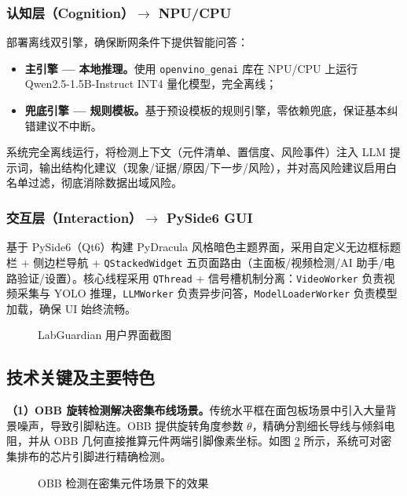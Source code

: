 \documentclass[a4paper,12pt,fontset=ubuntu]{ctexart}
\begin{document}
\subsubsection{认知层（Cognition）$\rightarrow$ NPU/CPU}

部署离线双引擎，确保断网条件下提供智能问答：

\begin{itemize}
    \item \textbf{主引擎 — 本地推理。}使用 \texttt{openvino\_genai} 库在 NPU/CPU 上运行 Qwen2.5-1.5B-Instruct INT4 量化模型，完全离线；
    \item \textbf{兜底引擎 — 规则模板。}基于预设模板的规则引擎，零依赖兜底，保证基本纠错建议不中断。
\end{itemize}

系统完全离线运行，将检测上下文（元件清单、置信度、风险事件）注入 LLM 提示词，输出结构化建议（现象/证据/原因/下一步/风险），并对高风险建议启用白名单过滤，彻底消除数据出域风险。

\subsubsection{交互层（Interaction）$\rightarrow$ PySide6 GUI}

基于 PySide6（Qt6）构建 PyDracula 风格暗色主题界面，采用自定义无边框标题栏 + 侧边栏导航 + \texttt{QStackedWidget} 五页面路由（主面板/视频检测/AI 助手/电路验证/设置）。核心线程采用 \texttt{QThread} + 信号槽机制分离：\texttt{VideoWorker} 负责视频采集与 YOLO 推理，\texttt{LLMWorker} 负责异步问答，\texttt{ModelLoaderWorker} 负责模型加载，确保 UI 始终流畅。

\begin{figure}[htbp]
    \centering
    \caption{LabGuardian 用户界面截图}
    \label{fig:gui}
\end{figure}

\subsection{技术关键及主要特色}

\textbf{（1）OBB 旋转检测解决密集布线场景。}传统水平框在面包板场景中引入大量背景噪声，导致引脚粘连。OBB 提供旋转角度参数 $\theta$，精确分割细长导线与倾斜电阻，并从 OBB 几何直接推算元件两端引脚像素坐标。如图 \ref{fig:obb-chip} 所示，系统可对密集排布的芯片引脚进行精确检测。

\begin{figure}[htbp]
    \centering
    \caption{OBB 检测在密集元件场景下的效果}
    \label{fig:obb-chip}
\end{figure}
\end{document}
